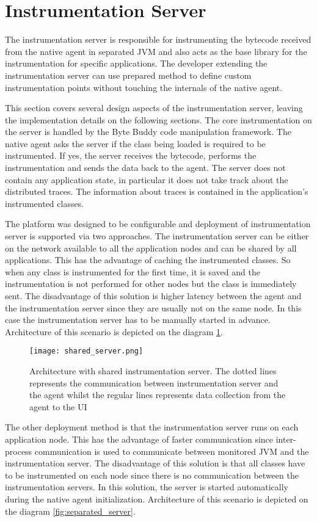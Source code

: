 \section{Instrumentation Server}
\label{sec:inst_server}
The instrumentation server is responsible for instrumenting the bytecode received from the native agent in separated JVM and also acts as the base library for the instrumentation for specific applications. The developer extending the instrumentation server can use prepared method to define custom instrumentation points without touching the internals of the native agent.

This section covers several design aspects of the instrumentation server, leaving the implementation details on the following sections. The core instrumentation on the server is handled by the Byte Buddy code manipulation framework. The native agent asks the server if the class being loaded is required to be instrumented. If yes, the server receives the bytecode, performs the instrumentation and sends the data back to the agent. The server does not contain any application state, in particular it does not take track about the distributed traces. The information about traces is contained in the application's instrumented classes.

The platform was designed to be configurable and deployment of instrumentation server is supported via two approaches. The instrumentation server can be either on the network available to all the application nodes and can be shared by all applications. This has the advantage of caching the instrumented classes. So when any class is instrumented for the first time, it is saved and the instrumentation is not performed for other nodes but the class is immediately sent. The disadvantage of this solution is higher latency between the agent and the instrumentation server since they are usually not on the same node. In this case the instrumentation server has to be manually started in advance. Architecture of this scenario is depicted on the diagram \ref{fig:shared_server}.
 
 \begin{figure}
 	\centering
 	\texttt{[image: shared\_server.png]}
 	\caption{Architecture with shared instrumentation server. The dotted lines represents the communication between instrumentation server and the agent whilst the regular lines represents data collection from the agent to the UI}
 	\label{fig:shared_server}
 \end{figure}
 
 The other deployment method is that the instrumentation server runs on each application node. This has the advantage of faster communication since  inter-process communication is used to communicate between monitored JVM and the instrumentation server. The disadvantage of this solution is that all classes have to be instrumented on each node since there is no communication between the instrumentation servers. In this solution, the server is started automatically during the native agent initialization. Architecture of this scenario is depicted on the diagram \ref{fig:separated_server}.
 
